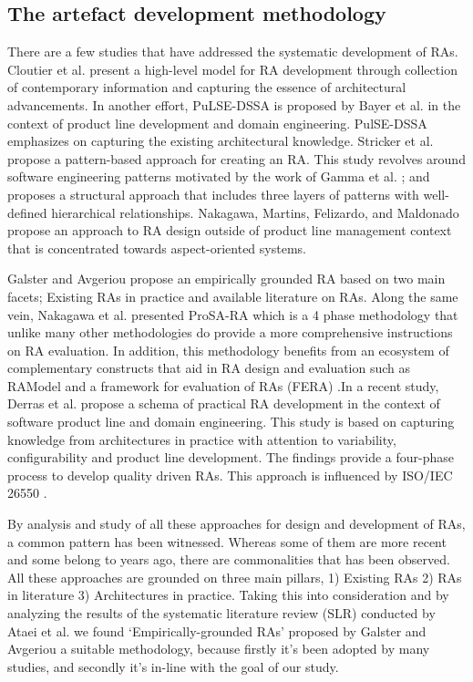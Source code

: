 \documentclass{bmcart}
\begin{document}
\subsection{The artefact development methodology}


There are a few studies that have addressed the systematic development of RAs. Cloutier et al. \cite{Cloutier} present a high-level model for RA development through collection of contemporary information and capturing the essence of architectural advancements. In another effort, PuLSE-DSSA is proposed by Bayer et al. \cite{bayer2004definition} in the context of product line development and domain engineering. PulSE-DSSA emphasizes on capturing the existing architectural knowledge. Stricker et al. \cite{stricker2010creating} propose a pattern-based approach for creating an RA. This study revolves around software engineering patterns motivated by the work of Gamma et al. \cite{gamma1995design}; and proposes a structural approach that includes three layers of patterns with well-defined hierarchical relationships. Nakagawa, Martins, Felizardo, and Maldonado \cite{nakagawa2009towards} propose an approach to RA design outside of product line management context that is concentrated towards aspect-oriented systems.

Galster and Avgeriou \cite{galster2011empirically} propose an empirically grounded RA based on two main facets; Existing RAs in practice and available literature on RAs. Along the same vein, Nakagawa et al. \cite{nakagawa2014consolidating} presented ProSA-RA which is a 4 phase methodology that unlike many other methodologies do provide a more comprehensive instructions on RA evaluation. In addition, this methodology benefits from an ecosystem of complementary constructs that aid in RA design and evaluation such as RAModel \cite{nakagawa2012ramodel} and a framework for evaluation of RAs (FERA) \cite{santos2013checklist}.In a recent study, Derras et al. \cite{derras2018reference} propose a schema of practical RA development in the context of software product line and domain engineering. This study is based on capturing knowledge from architectures in practice with attention to variability, configurability and product line development. The findings provide a four-phase process to develop quality driven RAs. This approach is influenced by ISO/IEC 26550 \cite{wg2015iso}.

By analysis and study of all these approaches for design and development of RAs, a common pattern has been witnessed. Whereas some of them are more recent and some belong to years ago, there are commonalities that has been observed. All these approaches are grounded on three main pillars, 1) Existing RAs 2) RAs in literature 3) Architectures in practice. Taking this into consideration and by analyzing the results of the systematic literature review (SLR) conducted by Ataei et al. \cite{AtaeiACIS} we found `Empirically-grounded RAs' proposed by Galster and Avgeriou \cite{galster2011empirically} a suitable methodology, because firstly it's been adopted by many studies, and secondly it's in-line with the goal of our study.
\end{document}
